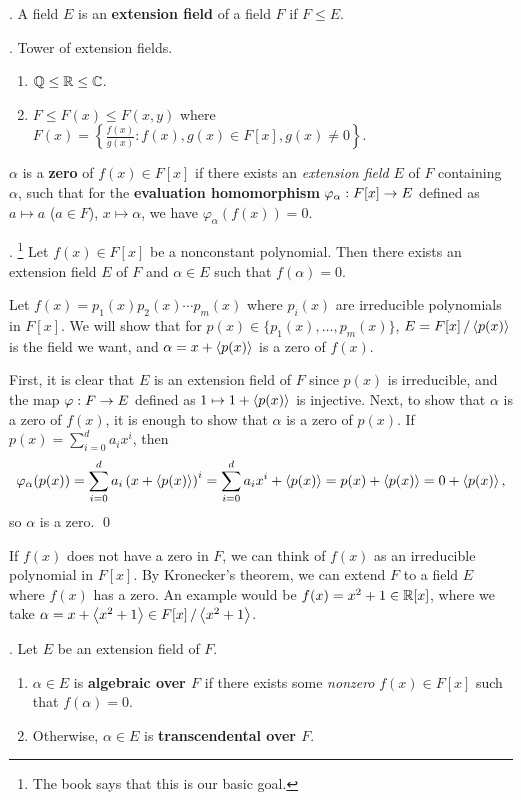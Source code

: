 .  A field \(E\) is an \textbf{extension field} of a field \(F\) if \(F \leq E\).

\ex. Tower of extension fields.
\begin{enumerate}
    \item \(\mathbb{Q} \leq \mathbb{R} \leq \mathbb{C}\).
    \item \(F \leq F(x) \leq F(x, y)\) where \(F(x) = \left\{\frac{f(x)}{g(x)} : f(x), g(x) \in F[x], g(x) \neq 0\right\}\).
\end{enumerate}

\recall \(\alpha\) is a \textbf{zero} of \(f(x) \in F[x]\) if there exists an \textit{extension field} \(E\) of \(F\) containing \(\alpha\), such that for the \textbf{evaluation homomorphism} \(\varphi_\alpha : F[x] \rightarrow E\) defined as \(a \mapsto a\) (\(a \in F\)), \(x \mapsto \alpha\), we have \(\varphi_\alpha(f(x)) = 0\).

\thm.  \footnote{The book says that this is our basic goal.} Let \(f(x) \in F[x]\) be a nonconstant polynomial. Then there exists an extension field \(E\) of \(F\) and \(\alpha \in E\) such that \(f(\alpha) = 0\).

\pf Let \(f(x) = p_1(x)p_2(x)\cdots p_m(x)\) where \(p_i(x)\) are irreducible polynomials in \(F[x]\). We will show that for \(p(x) \in \{p_1(x), \dots, p_m(x)\}\), \(E = F[x] \operatorname{/} \left\langle p(x) \right\rangle\) is the field we want, and \(\alpha = x + \left\langle p(x) \right\rangle\) is a zero of \(f(x)\).

First, it is clear that \(E\) is an extension field of \(F\) since \(p(x)\) is irreducible, and the map \(\varphi: F \rightarrow E\) defined as \(1 \mapsto 1 + \left\langle p(x) \right\rangle\) is injective. Next, to show that \(\alpha\) is a zero of \(f(x)\), it is enough to show that \(\alpha\) is a zero of \(p(x)\). If \(p(x) = \sum_{i=0}^d a_ix^i\), then
\[
    \varphi_\alpha(p(x)) = \sum_{i=0}^d a_i \left( x + \left\langle p(x) \right\rangle \right)^i = \sum_{i=0}^d a_ix^i + \left\langle p(x) \right\rangle = p(x) + \left\langle p(x) \right\rangle = 0 + \left\langle p(x) \right\rangle,
\]
so \(\alpha\) is a zero. \qed

If \(f(x)\) does not have a zero in \(F\), we can think of \(f(x)\) as an irreducible polynomial in \(F[x]\). By Kronecker's theorem, we can extend \(F\) to a field \(E\) where \(f(x)\) has a zero. An example would be \(f(x) = x^2 + 1 \in \mathbb{R}[x]\), where we take \(\alpha = x + \left\langle x^2 + 1 \right\rangle \in F[x] \operatorname{/} \left\langle x^2 + 1 \right\rangle\).

. Let \(E\) be an extension field of \(F\).
\begin{enumerate}
    \item \(\alpha \in E\) is \textbf{algebraic over \(F\)} if there exists some \textit{nonzero} \(f(x) \in F[x]\) such that \(f(\alpha) = 0\).
    \item Otherwise, \(\alpha \in E\) is \textbf{transcendental over \(F\)}.
\end{enumerate}

